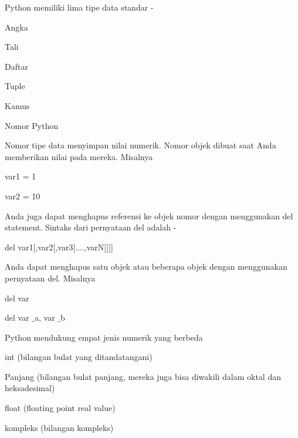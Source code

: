 \vspace{12pt}
\noindent 
Python memiliki lima tipe data standar - \par
\vspace{12pt}
\noindent 
Angka \par
\noindent 
Tali \par
\noindent 
Daftar \par
\noindent 
Tuple \par
\noindent 
Kamus \par
\noindent 
Nomor Python \par
\vspace{12pt}
\noindent 
Nomor tipe data menyimpan nilai numerik. $  $Nomor objek dibuat saat Anda memberikan nilai pada mereka. $  $Misalnya  \par
\vspace{12pt}
\noindent 
var1 = 1 \par
\noindent 
var2 = 10 \par
\vspace{12pt}
\noindent 
Anda juga dapat menghapus referensi ke objek nomor dengan menggunakan del statement. $  $Sintaks dari pernyataan del adalah - \par
\vspace{12pt}
\noindent 
del var1[,var2[,var3[....,varN]]]] \par
\vspace{12pt}
\noindent 
Anda dapat menghapus satu objek atau beberapa objek dengan menggunakan pernyataan del. $  $Misalnya  \par
\vspace{12pt}
\noindent 
del var \par
\noindent 
del var $  \_  $a, var $  \_  $b \par
\vspace{12pt}
\noindent 
Python mendukung empat jenis numerik yang berbeda  \par
\vspace{12pt}
\noindent 
int (bilangan bulat yang ditandatangani) \par
\vspace{12pt}
\noindent 
Panjang (bilangan bulat panjang, mereka juga bisa diwakili dalam oktal dan heksadesimal) \par
\vspace{12pt}
\noindent 
float (floating point real value) \par
\vspace{12pt}
\noindent 
kompleks (bilangan kompleks) \par
\vspace{12pt}
